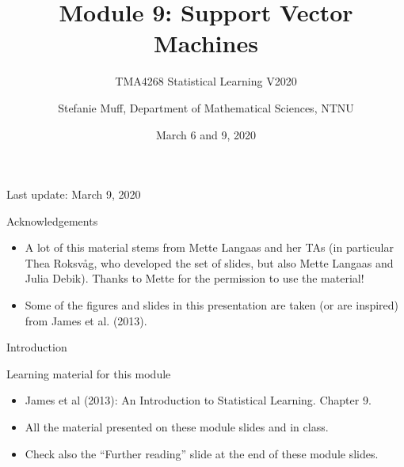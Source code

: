 \documentclass[10pt,ignorenonframetext,]{beamer}
\title{Module 9: Support Vector Machines}
\subtitle{TMA4268 Statistical Learning V2020}
\author{Stefanie Muff, Department of Mathematical Sciences, NTNU}
\date{March 6 and 9, 2020}
\begin{document}
\frame{\titlepage}

\begin{frame}

Last update: March 9, 2020

\end{frame}

\begin{frame}{Acknowledgements}
\protect\hypertarget{acknowledgements}{}

\begin{itemize}
\item
  A lot of this material stems from Mette Langaas and her TAs (in
  particular Thea Roksv\aa g, who developed the set of slides, but also
  Mette Langaas and Julia Debik). Thanks to Mette for the permission to
  use the material!
\item
  Some of the figures and slides in this presentation are taken (or are
  inspired) from James et al. (2013).
\end{itemize}

\end{frame}

\begin{frame}{Introduction}
\protect\hypertarget{introduction}{}

\begin{block}{Learning material for this module}

\vspace{2mm}

\begin{itemize}
\item
  James et al (2013): An Introduction to Statistical Learning. Chapter
  9.
\item
  All the material presented on these module slides and in class.
\item
  Check also the ``Further reading'' slide at the end of these module
  slides.
\end{itemize}

\end{block}

\end{frame}
\end{document}
